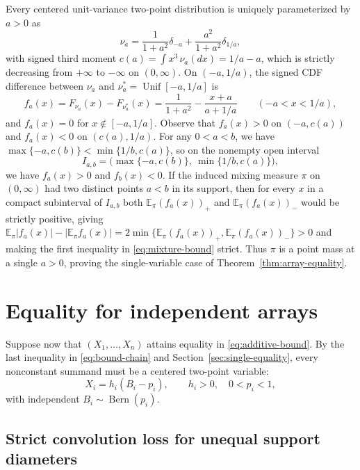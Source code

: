 \documentclass[11pt]{article}
\numberwithin{equation}{section}
\theoremstyle{remark}
\DeclareMathOperator{\Bern}{Bern}
\newcommand{\E}{\mathbb E}
\begin{document}
Every centered unit-variance two-point distribution is uniquely parameterized
by $a>0$ as
\[
 \nu_a=\frac1{1+a^2}\delta_{-a}
              +\frac{a^2}{1+a^2}\delta_{1/a},
\]
with signed third moment $c(a)=\int x^3\,\nu_a(dx)=1/a-a$, which is strictly
decreasing from $+\infty$ to $-\infty$ on $(0,\infty)$. On $(-a,1/a)$, the
signed CDF difference between $\nu_a$ and $\nu_a^*=\operatorname{Unif}[-a,1/a]$
is
\begin{equation}\label{eq:binary-cdf}
 f_a(x)=F_{\nu_a}(x)-F_{\nu_a^*}(x)
 =\frac1{1+a^2}-\frac{x+a}{a+1/a}\qquad(-a<x<1/a),
\end{equation}
and $f_a(x)=0$ for $x\notin[-a,1/a]$. Observe that $f_a(x)>0$ on $(-a,c(a))$
and $f_a(x)<0$ on $(c(a),1/a)$. For any $0<a<b$, we have
$\max\{-a,c(b)\}<\min\{1/b,c(a)\}$, so on the nonempty open interval
\begin{equation}\label{eq:opposite-interval}
          I_{a,b}=\bigl(\max\{-a,c(b)\},\ \min\{1/b,c(a)\}\bigr),
\end{equation}
we have $f_a(x)>0$ and $f_b(x)<0$. If the induced mixing measure $\pi$ on
$(0,\infty)$ had two distinct points $a<b$ in its support, then for every $x$
in a compact subinterval of $I_{a,b}$ both $\E_\pi(f_a(x))_+$ and
$\E_\pi(f_a(x))_-$ would be strictly positive, giving
$\E_\pi|f_a(x)|-|\E_\pi f_a(x)|=2\min\{\E_\pi(f_a(x))_+,\E_\pi(f_a(x))_-\}>0$
and making the first inequality in \eqref{eq:mixture-bound} strict. Thus
$\pi$ is a point mass at a single $a>0$, proving the single-variable case of
Theorem~\ref{thm:array-equality}.

\section{Equality for independent arrays}\label{sec:array}

Suppose now that $(X_1,\ldots,X_n)$ attains equality in
\eqref{eq:additive-bound}. By the last inequality in \eqref{eq:bound-chain}
and Section~\ref{sec:single-equality}, every nonconstant summand must be a
centered two-point variable:
\[
                  X_i=h_i(B_i-p_i),\qquad h_i>0,\quad 0<p_i<1,
\]
with independent $B_i\sim\Bern(p_i)$.

\subsection{Strict convolution loss for unequal support diameters}
\end{document}
